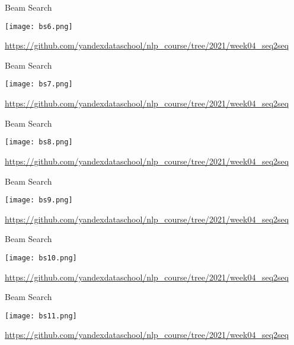 \documentclass[notes,12pt, aspectratio=169]{beamer}
\begin{document}
\begin{frame}{Beam Search}
	\begin{center}
		\texttt{[image: bs6.png]}
	\end{center}
	\vfill
	\footnotesize  {\color{blue} \url{https://github.com/yandexdataschool/nlp_course/tree/2021/week04_seq2seq}} 
\end{frame} 

\begin{frame}{Beam Search}
	\begin{center}
		\texttt{[image: bs7.png]}
	\end{center}
	\vfill
	\footnotesize  {\color{blue} \url{https://github.com/yandexdataschool/nlp_course/tree/2021/week04_seq2seq}} 
\end{frame} 

\begin{frame}{Beam Search}
	\begin{center}
		\texttt{[image: bs8.png]}
	\end{center}
	\vfill
	\footnotesize  {\color{blue} \url{https://github.com/yandexdataschool/nlp_course/tree/2021/week04_seq2seq}} 
\end{frame} 

\begin{frame}{Beam Search}
	\begin{center}
		\texttt{[image: bs9.png]}
	\end{center}
	\vfill
	\footnotesize  {\color{blue} \url{https://github.com/yandexdataschool/nlp_course/tree/2021/week04_seq2seq}} 
\end{frame} 

\begin{frame}{Beam Search}
	\begin{center}
		\texttt{[image: bs10.png]}
	\end{center}
	\vfill
	\footnotesize  {\color{blue} \url{https://github.com/yandexdataschool/nlp_course/tree/2021/week04_seq2seq}} 
\end{frame} 

\begin{frame}{Beam Search}
	\begin{center}
		\texttt{[image: bs11.png]}
	\end{center}
	\vfill
	\footnotesize  {\color{blue} \url{https://github.com/yandexdataschool/nlp_course/tree/2021/week04_seq2seq}} 
\end{frame} 
\end{document}
